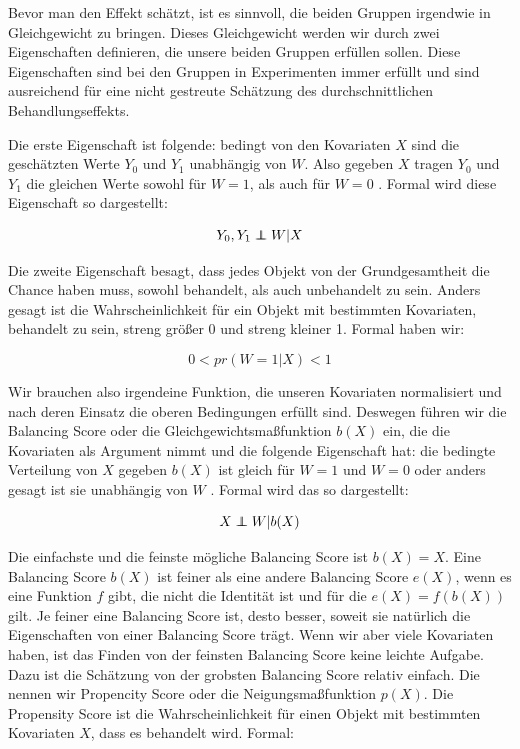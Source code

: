 \documentclass[12pt,a4paper,twoside]{scrartcl}
\numberwithin{equation}{section}
\newcommand\independent{\protect\mathpalette{\protect\independenT}{\perp}}
\def\independenT#1#2{\mathrel{\rlap{$#1#2$}\mkern2mu{#1#2}}}
\begin{document}
\noindent
Bevor man den Effekt schätzt, ist es sinnvoll, die beiden Gruppen irgendwie in Gleichgewicht zu bringen. Dieses Gleichgewicht werden wir durch zwei Eigenschaften definieren, die unsere beiden Gruppen erfüllen sollen. Diese Eigenschaften sind bei den Gruppen in Experimenten immer erfüllt und sind ausreichend für eine nicht gestreute Schätzung des durchschnittlichen Behandlungseffekts.\par

\noindent
Die erste Eigenschaft ist folgende: bedingt von den Kovariaten $X$ sind die geschätzten Werte $Y_0$ und $Y_1$ unabhängig von $W$. Also gegeben $X$ tragen $Y_0$ und $Y_1$ die gleichen Werte sowohl für $W = 1$, als auch für $W = 0$ \cite{rosenbaum1983central}. Formal wird diese Eigenschaft so dargestellt:\par
 
\begin{equation}\label{eq:2.3}
  Y_0,Y_1 \independent W|X
\end{equation}

\noindent
Die zweite Eigenschaft besagt, dass jedes Objekt von der Grundgesamtheit die Chance haben muss, sowohl behandelt, als auch unbehandelt zu sein. Anders gesagt ist die Wahrscheinlichkeit für ein Objekt mit bestimmten Kovariaten, behandelt zu sein, streng größer 0 und streng kleiner 1\cite{rosenbaum1983central}. Formal haben wir:\par

\begin{equation}\label{eq:2.4}
 0 < pr(W=1|X)<1
\end{equation}

\noindent
Wir brauchen also irgendeine Funktion, die unseren Kovariaten normalisiert und nach deren Einsatz die oberen Bedingungen erfüllt sind. Deswegen führen wir die Balancing Score oder die Gleichgewichtsmaßfunktion $b(X)$ ein, die die Kovariaten als Argument nimmt und die folgende Eigenschaft hat: die bedingte Verteilung von $X$ gegeben $b(X)$ ist gleich für $W = 1$ und $W = 0$ oder anders gesagt ist sie unabhängig von $W$ \cite{dawid1976properties}. Formal wird das so dargestellt:\par

\begin{equation}\label{eq:2.5}
  X \independent W|b(X)
\end{equation}

\noindent     
Die einfachste und die feinste mögliche Balancing Score ist $b(X) = X$. Eine Balancing Score $b(X)$ ist feiner als eine andere Balancing Score $e(X)$, wenn es eine Funktion $f$ gibt, die nicht die Identität ist und für die $e(X) = f(b(X))$ gilt. Je feiner eine Balancing Score ist, desto besser, soweit sie natürlich die Eigenschaften von einer Balancing Score trägt. Wenn wir aber viele Kovariaten haben, ist das Finden von der feinsten Balancing Score keine leichte Aufgabe. Dazu ist die Schätzung von der grobsten Balancing Score relativ einfach. Die nennen wir Propencity Score oder die Neigungsmaßfunktion $p(X)$. Die Propensity Score ist die Wahrscheinlichkeit für einen Objekt mit bestimmten Kovariaten $X$, dass es behandelt wird. Formal: \par 
\end{document}
